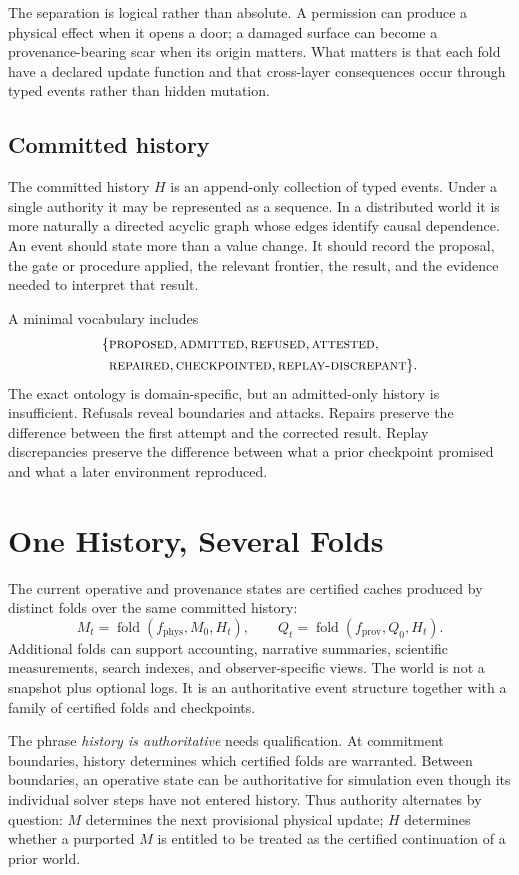 \documentclass[11pt]{article}
\newcommand{\Fold}{\operatorname{fold}}
\begin{document}
The separation is logical rather than absolute. A permission can produce a physical effect when it opens a door; a damaged surface can become a provenance-bearing scar when its origin matters. What matters is that each fold have a declared update function and that cross-layer consequences occur through typed events rather than hidden mutation.

\subsection{Committed history}

The committed history $H$ is an append-only collection of typed events. Under a single authority it may be represented as a sequence. In a distributed world it is more naturally a directed acyclic graph whose edges identify causal dependence. An event should state more than a value change. It should record the proposal, the gate or procedure applied, the relevant frontier, the result, and the evidence needed to interpret that result.

A minimal vocabulary includes
\[
\begin{split}
\{&\textsc{proposed},\textsc{admitted},\textsc{refused},\textsc{attested},\\
  &\textsc{repaired},\textsc{checkpointed},\textsc{replay-discrepant}\}.
\end{split}
\]
The exact ontology is domain-specific, but an admitted-only history is insufficient. Refusals reveal boundaries and attacks. Repairs preserve the difference between the first attempt and the corrected result. Replay discrepancies preserve the difference between what a prior checkpoint promised and what a later environment reproduced.

\section{One History, Several Folds}

The current operative and provenance states are certified caches produced by distinct folds over the same committed history:
\[
M_t=\Fold(f_{\mathrm{phys}},M_0,H_t), \qquad
Q_t=\Fold(f_{\mathrm{prov}},Q_0,H_t).
\]
Additional folds can support accounting, narrative summaries, scientific measurements, search indexes, and observer-specific views. The world is not a snapshot plus optional logs. It is an authoritative event structure together with a family of certified folds and checkpoints.

The phrase \emph{history is authoritative} needs qualification. At commitment boundaries, history determines which certified folds are warranted. Between boundaries, an operative state can be authoritative for simulation even though its individual solver steps have not entered history. Thus authority alternates by question: $M$ determines the next provisional physical update; $H$ determines whether a purported $M$ is entitled to be treated as the certified continuation of a prior world.
\end{document}
